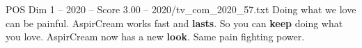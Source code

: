 \begin{textsample}{POS Dim 1 – 2020 – Score 3.00 – 2020/tv\_com\_2020\_57.txt}  \label{ex:f1_pos_088}
Doing what we love can be painful.
AspirCream works fast and \textbf{lasts}.
So you can \textbf{keep} doing what you love.
AspirCream now has a new \textbf{look}.
Same pain fighting power.

\end{textsample}
